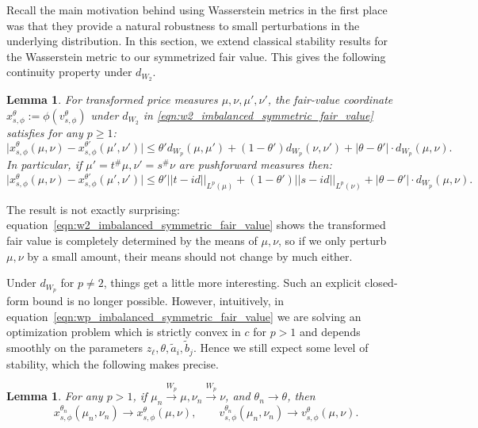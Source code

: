 \documentclass[11pt]{article}
\theoremstyle{plain}
\newtheorem{lemma}[theorem]{Lemma}
\theoremstyle{definition}
\numberwithin{equation}{section}
\begin{document}
\noindent Recall the main motivation behind using Wasserstein metrics in the first place was
that they provide a natural robustness to small perturbations in the underlying distribution.
In this section, we extend classical stability results for the Wasserstein metric to our symmetrized
fair value. This gives the following continuity property under $d_{W_2}$.

\begin{lemma}
    \label{lem:fv_continuity_w2}
    For transformed price measures $\mu,\nu,\mu',\nu'$, the fair-value coordinate $x_{s,\phi}^\theta:=\phi(v_{s,\phi}^\theta)$ under $d_{W_2}$ in \eqref{eqn:w2_imbalanced_symmetric_fair_value} satisfies for any $p \geq 1$:
    \begin{equation}
        \Big| x_{s,\phi}^\theta(\mu, \nu) - x_{s,\phi}^{\theta'}(\mu', \nu') \Big | \leq \theta' d_{W_p}(\mu,\mu') + (1-\theta') d_{W_p}(\nu,\nu') + |\theta-\theta'| \cdot d_{W_p}(\mu,\nu).
    \end{equation}
    \noindent In particular, if $\mu' = t^\# \mu, \nu' = s^\# \nu$ are pushforward measures then:
    \begin{equation}
        \Big| x_{s,\phi}^\theta(\mu, \nu) - x_{s,\phi}^{\theta'}(\mu', \nu') \Big | \leq \theta' ||t - id||_{L^p(\mu)} + (1-\theta') ||s-id||_{L^p(\nu)} + |\theta - \theta'| \cdot d_{W_p}(\mu,\nu).
    \end{equation}
\end{lemma}
%
The result is not exactly surprising: equation~\eqref{eqn:w2_imbalanced_symmetric_fair_value} shows the transformed fair value is completely determined by
the means of $\mu, \nu$, so if we only perturb $\mu, \nu$ by a small amount, their means should not change by much either.

Under $d_{W_p}$ for $p \neq 2$, things get a little more interesting.
Such an explicit closed-form bound is no longer possible. However, intuitively,
in equation~\eqref{eqn:wp_imbalanced_symmetric_fair_value} we are solving an optimization
problem which is strictly convex in $c$ for $p > 1$ and depends smoothly on the parameters
$z_\ell,\theta,\widetilde a_i,\widetilde b_j$. Hence we still expect some level of stability, which the following makes precise.

\begin{lemma}
    For any $p > 1$, if $\mu_n \xrightarrow{W_p} \mu, \nu_n \xrightarrow{W_p} \nu$, and $\theta_n \to \theta$, then
      \[x_{s,\phi}^{\theta_n}(\mu_n, \nu_n) \to x_{s,\phi}^\theta(\mu, \nu),
      \qquad v_{s,\phi}^{\theta_n}(\mu_n,\nu_n)\to v_{s,\phi}^\theta(\mu,\nu).\]
      \label{lem:wp_fv_stability}
\end{lemma}
\end{document}
